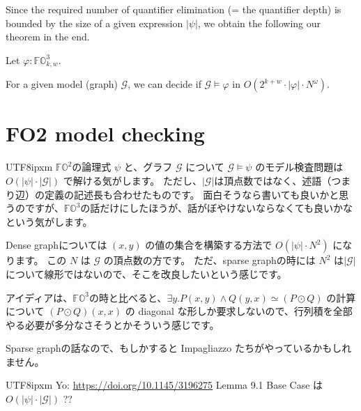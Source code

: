 \documentclass[a4paper,UKenglish,cleveref, autoref, thm-restate]{lipics-v2021}
\newcounter{tempTheoremCounter} %
\newenvironment{Jcomment}%
{\begin{screen}\begin{CJK}{UTF8}{ipxm}}%
{\end{CJK}\end{screen}}
\newcommand{\fo}{\ensuremath{\mathbb{FO}}}
\begin{document}
Since the required number of quantifier elimination (= the quantifier depth) is bounded by the size of a given expression $|\psi|$, we obtain the following our theorem in the end.


\setcounter{tempTheoremCounter}{\value{theorem}}
\begin{theorem}[Restatement]
Let $\varphi : \fo^3_{k, w}$.

For a given model (graph) $\mathcal{G}$,
we can decide if $\mathcal{G} \models \varphi$ in $O(2^{k+w} \cdot |\varphi| \cdot N^{\omega})$.
\end{theorem}
\setcounter{theorem}{\value{tempTheoremCounter}}

\section{FO2 model checking}

\begin{Jcomment}
    $\fo^2$の論理式 $\psi$ と、グラフ $\mathcal{G}$ について
    $\mathcal{G} \models \psi$ のモデル検査問題は
    $O(|\psi| \cdot |\mathcal{G}|)$ で解ける気がします。
    ただし、$|\mathcal{G}|$は頂点数ではなく、述語（つまり辺）の定義の記述長も合わせたものです。
    面白そうなら書いても良いかと思うのですが、$\fo^3$の話だけにしたほうが、話がぼやけないならなくても良いかなという気がします。

    Dense graphについては $(x, y)$ の値の集合を構築する方法で $O(|\psi| \cdot N^2)$ になります。
    この $N$ は $\mathcal{G}$ の頂点数の方です。
    ただ、sparse graphの時には $N^2$ は$|\mathcal{G}|$について線形ではないので、そこを改良したいという感じです。

    アイディアは、$\fo^3$の時と比べると、$\exists y. P(x, y) \land Q(y, x) \simeq (P \odot Q)$ の計算について $(P \odot Q)(x, x)$ の diagonal な形しか要求しないので、行列積を全部やる必要が多分なさそうとかそういう感じです。

    Sparse graphの話なので、もしかすると Impagliazzo たちがやっているかもしれません。
\end{Jcomment}

\begin{Jcomment}
    Yo:
    \url{https://doi.org/10.1145/3196275} Lemma 9.1 Base Case は $O(|\psi| \cdot |\mathcal{G}|)$ ??
\end{Jcomment}
\end{document}
